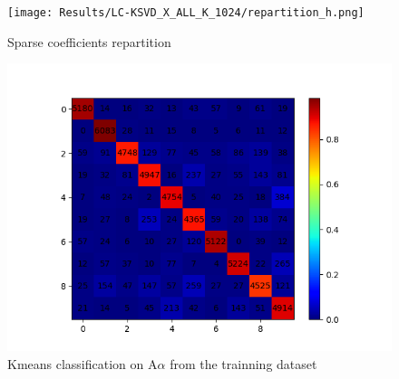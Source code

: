 \documentclass[a4paper,10pt]{article}
\begin{document}
\begin{figure}[h]
 \centering
 \texttt{[image: Results/LC-KSVD\_X\_ALL\_K\_1024/repartition\_h.png]}
 \caption{Sparse coefficients repartition}
\end{figure}
\begin{figure}[h]
 \centering
 \includegraphics[scale=0.72]{Results/LC-KSVD_X_ALL_K_1024/confusion_matrix_train.png}
 \caption{Kmeans classification on A$\alpha$ from the trainning dataset}
\end{figure}
\end{document}

